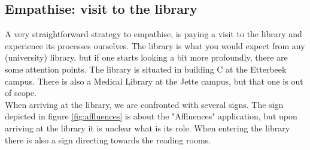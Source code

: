 \documentclass[a4paper, 11pt]{article}
\begin{document}
\subsection{Empathise: visit to the library}
A very straightforward strategy to empathise, is paying a visit to the library and experience its processes ourselves. The library is what you would expect from any (university) library, but if one starts looking a bit more profoundly, there are some attention points. The library is situated in building C at the Etterbeek campus. There is also a Medical Library at the Jette campus, but that one is out of scope.\\
When arriving at the library, we are confronted with several signs. The sign depicted in figure \ref{fig:affluences} is about the "Affluences" application, but upon arriving at the library it is unclear what is its role. When entering the library there is also a sign directing towards the reading rooms. 
\end{document}
